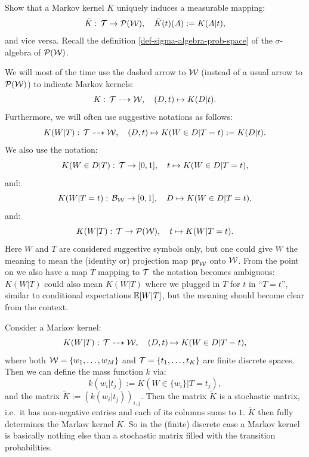 \begin{Exc} 
    Show that a Markov kernel $K$ uniquely induces a measurable mapping:
    \[ \bar K:\, \mathcal{T} \to \mathcal{P}(\mathcal{W}),\quad  \bar K(t)(A):=K(A|t),  \]%
    and vice versa. 
    Recall the definition \ref{def-sigma-algebra-prob-space} of 
     the $\sigma$-algebra of  $\mathcal{P}(\mathcal{W})$.
\end{Exc}

\begin{Not}
    We will most of the time use the dashed arrow to $\mathcal{W}$ (instead of a usual arrow to $\mathcal{P}(\mathcal{W})$) to indicate Markov kernels:
    \[K:\, \mathcal{T} \dashrightarrow \mathcal{W},\quad (D,t) \mapsto K(D|t).  \]
    Furthermore, we will often use suggestive notations as follows:
    \[K(W|T):\, \mathcal{T} \dashrightarrow \mathcal{W},\quad (D,t) \mapsto K(W \in D|T=t):=K(D|t).  \]
    We also use the notation:
    \[ K(W \in D|T):\, \mathcal{T} \to [0,1],\quad t \mapsto K(W \in D|T=t),  \]
    and:
    \[ K(W|T=t):\, \mathcal{B}_{\mathcal{W}} \to [0,1],\quad D \mapsto K(W \in D|T=t),  \]
    and:
    \[ K(W|T):\, \mathcal{T} \to \mathcal{P}(\mathcal{W}),\quad t \mapsto K(W|T=t).\]
    Here $W$ and $T$ are considered suggestive symbols only, but one could give $W$ the meaning to mean the (identity or) projection map 
    $\mathrm{pr}_{\mathcal{W}}$ onto $\mathcal{W}$. 
    From the point on we also have a map $T$ mapping to $\mathcal{T}$ the notation becomes ambiguous: $K(W|T)$ could also mean $K(W|T)$ where we plugged in $T$ for $t$ in ``$T=t$'',
     similar to conditional expectations $\mathbb{E}[W|T]$, but the meaning should become clear from the context.
\end{Not}




\begin{Eg}
    Consider a Markov kernel:
    \[K(W|T):\, \mathcal{T} \dashrightarrow \mathcal{W},\quad (D,t) \mapsto K(W \in D|T=t),  \]
    where both $\mathcal{W}=\{w_1,\dots,w_M\}$ and $\mathcal{T}=\{t_1,\dots,t_K\}$ are finite discrete spaces.
    Then we can define the mass function $k$ via:
    \[  k(w_i|t_j) := K(W \in \{w_i\}|T=t_j),  \]
    and the matrix $\tilde K:=(k(w_i|t_j))_{i,j}$.
    Then the matrix $\tilde K$ is a stochastic matrix, i.e.\ it has non-negative entries and each of its columns sums to $1$. 
    $\tilde K$ then fully determines the Markov kernel $K$.
    So in the (finite) discrete case a Markov kernel is basically nothing else than a stochastic matrix filled with the transition probabilities.
\end{Eg}

